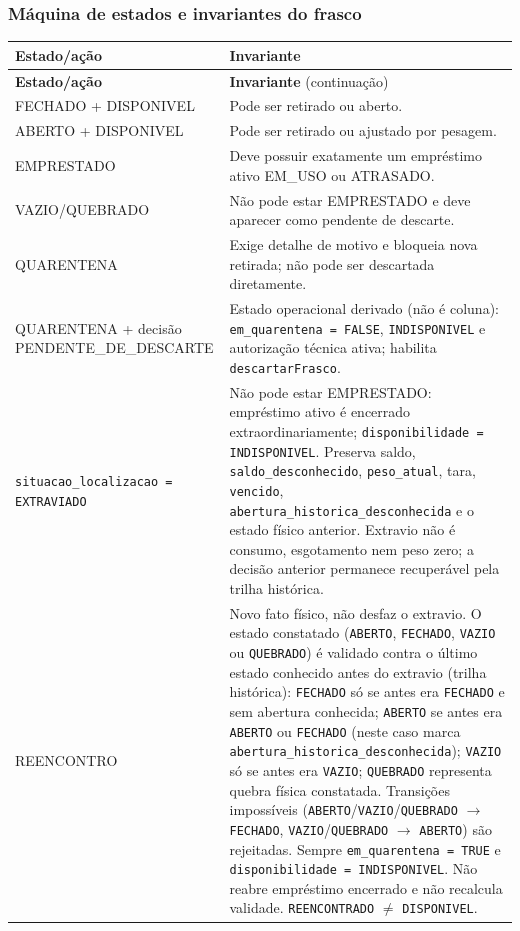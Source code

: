 \subsubsection{Máquina de estados e invariantes do frasco}
\begin{longtable}{>{\raggedright\arraybackslash}p{} >{\raggedright\arraybackslash}p{}}
\toprule
\textbf{Estado/ação} & \textbf{Invariante}\\
\midrule
\endfirsthead
\toprule
\textbf{Estado/ação} & \textbf{Invariante} (continuação)\\
\midrule
\endhead
\bottomrule
\endfoot
FECHADO + DISPONIVEL & Pode ser retirado ou aberto.\\
ABERTO + DISPONIVEL & Pode ser retirado ou ajustado por pesagem.\\
EMPRESTADO & Deve possuir exatamente um empréstimo ativo EM\_USO ou ATRASADO.\\
VAZIO/QUEBRADO & Não pode estar EMPRESTADO e deve aparecer como pendente de descarte.\\
QUARENTENA & Exige detalhe de motivo e bloqueia nova retirada; não pode ser descartada diretamente.\\
QUARENTENA + decisão PENDENTE\_DE\_DESCARTE & Estado operacional derivado (não é coluna): \texttt{em\_quarentena = FALSE}, \texttt{INDISPONIVEL} e autorização técnica ativa; habilita \texttt{descartarFrasco}.\\
\texttt{situacao\_localizacao = EXTRAVIADO} & Não pode estar EMPRESTADO: empréstimo ativo é encerrado extraordinariamente; \texttt{disponibilidade = INDISPONIVEL}. Preserva saldo, \texttt{saldo\_desconhecido}, \texttt{peso\_atual}, tara, \texttt{vencido}, \texttt{abertura\_historica\_desconhecida} e o estado físico anterior. Extravio não é consumo, esgotamento nem peso zero; a decisão anterior permanece recuperável pela trilha histórica.\\
REENCONTRO & Novo fato físico, não desfaz o extravio. O estado constatado (\texttt{ABERTO}, \texttt{FECHADO}, \texttt{VAZIO} ou \texttt{QUEBRADO}) é validado contra o último estado conhecido antes do extravio (trilha histórica): \texttt{FECHADO} só se antes era \texttt{FECHADO} e sem abertura conhecida; \texttt{ABERTO} se antes era \texttt{ABERTO} ou \texttt{FECHADO} (neste caso marca \texttt{abertura\_historica\_desconhecida}); \texttt{VAZIO} só se antes era \texttt{VAZIO}; \texttt{QUEBRADO} representa quebra física constatada. Transições impossíveis (\texttt{ABERTO}/\texttt{VAZIO}/\texttt{QUEBRADO} $\rightarrow$ \texttt{FECHADO}, \texttt{VAZIO}/\texttt{QUEBRADO} $\rightarrow$ \texttt{ABERTO}) são rejeitadas. Sempre \texttt{em\_quarentena = TRUE} e \texttt{disponibilidade = INDISPONIVEL}. Não reabre empréstimo encerrado e não recalcula validade. \texttt{REENCONTRADO} $\neq$ \texttt{DISPONIVEL}.\\

\end{longtable}
